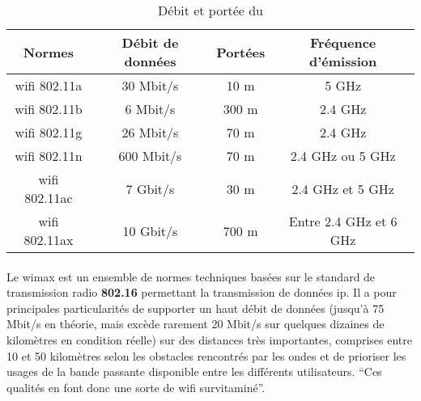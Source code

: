 \begin{table}[H]
    \centering
    \begin{tabular}{|c|c|c|c|}
        \hline
        \rowcolor{tableColorDark} Normes & Débit de données & Portées & Fréquence d'émission   \\
        \hline

        \gls{wifi} 802.11a               & 30 Mbit/s        & 10 m    & 5 GHz                  \\\hline
        \gls{wifi} 802.11b               & 6 Mbit/s         & 300 m   & 2.4 GHz                \\\hline
        \gls{wifi} 802.11g               & 26 Mbit/s        & 70 m    & 2.4 GHz                \\\hline
        \gls{wifi} 802.11n               & 600 Mbit/s       & 70 m    & 2.4 GHz ou 5 GHz       \\\hline
        \gls{wifi} 802.11ac              & 7 Gbit/s         & 30 m    & 2.4 GHz et 5 GHz       \\\hline
        \gls{wifi} 802.11ax              & 10 Gbit/s        & 700 m   & Entre 2.4 GHz et 6 GHz \\\hline
    \end{tabular}
    \label{tab:debitPorteeWifi}
    \caption{Débit et portée du }
    \nocite{debitPortee}
\end{table}

\paragraph{}
\label{sec:wimax}

Le \gls{wimax} est un ensemble de normes techniques basées sur le standard de transmission radio \textbf{802.16}
permettant la transmission de données \gls{ip}.\newline
Il a pour principales particularités de supporter un haut débit de données (jusqu’à 75 Mbit/s en théorie, mais
excède rarement 20 Mbit/s sur quelques dizaines de kilomètres en condition réelle) sur des distances très importantes,
comprises entre 10 et 50 kilomètres selon les obstacles rencontrés par les ondes et de prioriser les usages de
la bande passante disponible entre les différents utilisateurs. \enquote{Ces qualités en font donc une sorte
    de \gls{wifi} survitaminé}{\cite{wimax}}.

